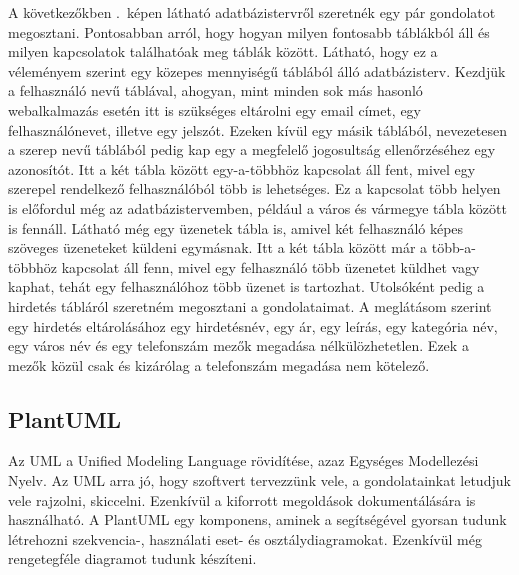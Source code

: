 \documentclass[]{thesis-ekf}
\theoremstyle{definition}
\theoremstyle{remark}
\begin{document}
	A következőkben .~képen látható adatbázistervről szeretnék egy pár gondolatot megosztani. Pontosabban arról, hogy hogyan milyen fontosabb táblákból áll és milyen kapcsolatok találhatóak meg táblák között. Látható, hogy ez a véleményem szerint egy közepes mennyiségű táblából álló adatbázisterv. Kezdjük a felhasználó nevű táblával, ahogyan, mint minden sok más hasonló webalkalmazás esetén itt is szükséges eltárolni egy email címet, egy felhasználónevet, illetve egy jelszót. Ezeken kívül egy másik táblából, nevezetesen a szerep nevű táblából pedig kap egy a megfelelő jogosultság ellenőrzéséhez egy azonosítót. Itt a két tábla között egy-a-többhöz kapcsolat áll fent, mivel egy szerepel rendelkező felhasználóból több is lehetséges. Ez a kapcsolat több helyen is előfordul még az adatbázistervemben, például a város és vármegye tábla között is fennáll. Látható még egy üzenetek tábla is, amivel két felhasználó képes szöveges üzeneteket küldeni egymásnak. Itt a két tábla között már a több-a-többhöz kapcsolat áll fenn, mivel egy felhasználó több üzenetet küldhet vagy kaphat, tehát egy felhasználóhoz több üzenet is tartozhat. Utolsóként pedig a hirdetés tábláról szeretném megosztani a gondolataimat. A meglátásom szerint egy hirdetés eltárolásához egy hirdetésnév, egy ár, egy leírás, egy kategória név, egy város név és egy telefonszám mezők megadása nélkülözhetetlen. Ezek a mezők közül csak és kizárólag a telefonszám megadása nem kötelező. 
	
	\subsection{PlantUML}\label{sc-plantuml}
	Az UML a Unified Modeling Language rövidítése, azaz Egységes Modellezési Nyelv. Az UML arra jó, hogy szoftvert tervezzünk vele, a gondolatainkat letudjuk vele rajzolni, skiccelni. Ezenkívül a kiforrott megoldások dokumentálására is használható. A PlantUML egy komponens, aminek a segítségével gyorsan tudunk létrehozni szekvencia-, használati eset- és osztálydiagramokat. Ezenkívül még rengetegféle diagramot tudunk készíteni. \cite{PlantUML}
	
\end{document}
